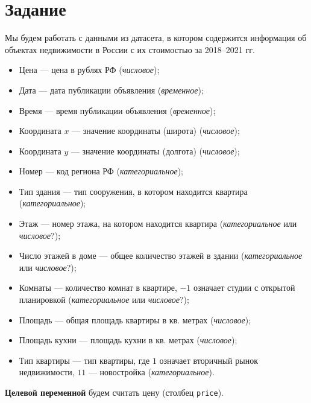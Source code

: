 \section{Задание}

Мы будем работать с данными из датасета\cite{kaggle_russia_real_estate}, в котором содержится информация об объектах недвижимости в России с их стоимостью за 2018--2021 гг.

\begin{itemize}
    \item Цена --- цена в рублях РФ (\textit{числовое});
    \item Дата --- дата публикации объявления (\textit{временное});
    \item Время --- время публикации объявления (\textit{временное});
    \item Координата \(x\) --- значение координаты (широта) (\textit{числовое});
    \item Координата \(y\) --- значение координаты (долгота) (\textit{числовое});
    \item Номер --- код региона РФ (\textit{категориальное});
    \item Тип здания --- тип сооружения, в котором находится квартира (\textit{категориальное});
    \item Этаж --- номер этажа, на котором находится квартира (\textit{категориальное} или \textit{числовое}?);
    \item Число этажей в доме --- общее количество этажей в здании (\textit{категориальное} или \textit{числовое}?);
    \item Комнаты --- количество комнат в квартире, \(-1\) означает студии с открытой планировкой (\textit{категориальное} или \textit{числовое}?);
    \item Площадь --- общая площадь квартиры в кв. метрах (\textit{числовое});
    \item Площадь кухни --- площадь кухни в кв. метрах (\textit{числовое});
    \item Тип квартиры --- тип квартиры, где \(1\) означает вторичный рынок недвижимости, \(11\) --- новостройка (\textit{категориальное}).
\end{itemize}

\textbf{Целевой переменной} будем считать цену (столбец \texttt{price}).

